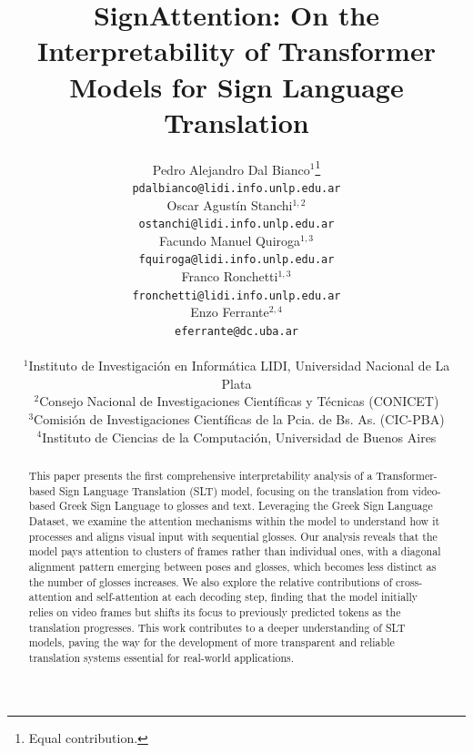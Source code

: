 \documentclass{article}
\title{SignAttention: On the Interpretability of Transformer Models for Sign Language Translation}
\author{%
  Pedro Alejandro Dal Bianco$^{1}$\thanks{Equal contribution.} \\
  \texttt{pdalbianco@lidi.info.unlp.edu.ar} \\
  \And
  Oscar Agustín Stanchi$^{1,2}$\footnotemark[1] \\
  \texttt{ostanchi@lidi.info.unlp.edu.ar} \\
  \And
  Facundo Manuel Quiroga$^{1,3}$ \\
  \texttt{fquiroga@lidi.info.unlp.edu.ar} \\
  \And
  Franco Ronchetti$^{1,3}$ \\
  \texttt{fronchetti@lidi.info.unlp.edu.ar} \\
  \And
  Enzo Ferrante$^{2,4}$ \\
  \texttt{eferrante@dc.uba.ar} \\ \\
  $^{1}$Instituto de Investigación en Informática LIDI, Universidad Nacional de La Plata \\
  $^{2}$Consejo Nacional de Investigaciones Científicas y Técnicas (CONICET) \\
  $^{3}$Comisión de Investigaciones Científicas de la Pcia. de Bs. As. (CIC-PBA) \\
  $^{4}$Instituto de Ciencias de la Computación, Universidad de Buenos Aires \\
}
\begin{document}
\maketitle


\begin{abstract}

This paper presents the first comprehensive interpretability analysis of a Transformer-based Sign Language Translation (SLT) model, focusing on the translation from video-based Greek Sign Language to glosses and text. Leveraging the Greek Sign Language Dataset, we examine the attention mechanisms within the model to understand how it processes and aligns visual input with sequential glosses. Our analysis reveals that the model pays attention to clusters of frames rather than individual ones, with a diagonal alignment pattern emerging between poses and glosses, which becomes less distinct as the number of glosses increases. We also explore the relative contributions of cross-attention and self-attention at each decoding step, finding that the model initially relies on video frames but shifts its focus to previously predicted tokens as the translation progresses. This work contributes to a deeper understanding of SLT models, paving the way for the development of more transparent and reliable translation systems essential for real-world applications.


\end{abstract}















\medskip

{ 
\small


}


\end{document}
